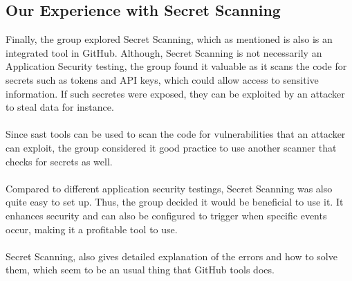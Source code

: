 \subsection{Our Experience with Secret Scanning}
Finally, the group explored Secret Scanning, which as mentioned is also is an integrated tool in GitHub. Although, Secret Scanning is not necessarily an Application Security testing, the group found it valuable as it scans the code for secrets such as tokens and API keys, which could allow access to sensitive information. If such secretes were exposed, they can be exploited by an attacker to steal data for instance. 
\\~\\
Since \acrshort{sast} tools can be used to scan the code for vulnerabilities that an attacker can exploit, the group considered it good practice to use another scanner that checks for secrets as well. 
\\~\\
Compared to different application security testings, Secret Scanning was also quite easy to set up. Thus, the group decided it would be beneficial to use it. It enhances security and can also be configured to trigger when specific events occur, making it a profitable tool to use. 
\\~\\
Secret Scanning, also gives detailed explanation of the errors and how to solve them, which seem to be an usual thing that GitHub tools does. 

